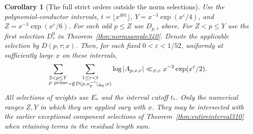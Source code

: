 \documentclass[a4paper,11pt]{article}
\newtheorem{corollary}[proposition]{Corollary}
\theoremstyle{definition}
\theoremstyle{remark}
\numberwithin{equation}{section}
\begin{document}
\begin{corollary}[The full strict orders outside the norm selections]\leavevmode\label{cor:allsample341}
Use the polynomial-conductor intervals, $t=\lfloor x^{401}\rfloor$,
$Y=x^{-3}\exp(x^\varepsilon/4)$, and $Z=x^{-3}\exp(x^\varepsilon/6)$.
For each odd $p\le Z$ use $D_{p,\tau}$ above. For $Z<p\le Y$ use
the first selection $D^0_\tau$ in Theorem~\ref{thm:normsample340}.
Denote the applicable selection by $D(p,\tau;x)$. Then, for each fixed $0<\varepsilon<1/52$, uniformly at sufficiently
large $x$ on these intervals,
\[
 \sum_{\substack{2<p\le Y\\p\ {\rm prime}}}
 \sum_{\substack{1\le r<t\\ r\notin D(p,\kappa_p^{-r}|_{\Delta_0};x)}}
           \log|A_{p,x,r}|
        \ll_{\psi,\varepsilon}x^{-2}\exp(x^\varepsilon/2).
\]
All selections of weights use $E_*$ and the interval cutoff $t_*$.
Only the numerical ranges $Z,Y$ in which they are applied vary with
$x$. They may be intersected with the earlier exceptional component
selections of Theorem~\ref{thm:entireinterval310} when retaining
terms in the residual length sum.
\end{corollary}
\end{document}
